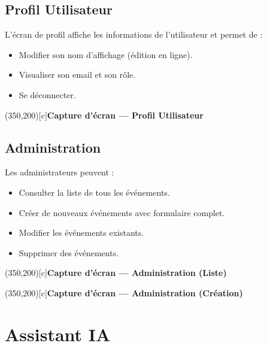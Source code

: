 \documentclass[12pt,a4paper]{article}
\begin{document}
\subsection{Profil Utilisateur}

L'écran de profil affiche les informations de l'utilisateur et permet de :
\begin{itemize}
    \item Modifier son nom d'affichage (édition en ligne).
    \item Visualiser son email et son rôle.
    \item Se déconnecter.
\end{itemize}

\vspace{0.5cm}
\begin{center}
    \framebox(350,200)[c]{\textbf{Capture d'écran --- Profil Utilisateur}}
\end{center}
\vspace{0.3cm}

\subsection{Administration}

Les administrateurs peuvent :
\begin{itemize}
    \item Consulter la liste de tous les événements.
    \item Créer de nouveaux événements avec formulaire complet.
    \item Modifier les événements existants.
    \item Supprimer des événements.
\end{itemize}

\vspace{0.5cm}
\begin{center}
    \framebox(350,200)[c]{\textbf{Capture d'écran --- Administration (Liste)}}
\end{center}
\vspace{0.3cm}

\begin{center}
    \framebox(350,200)[c]{\textbf{Capture d'écran --- Administration (Création)}}
\end{center}
\vspace{0.3cm}

\section{Assistant IA}
\end{document}
